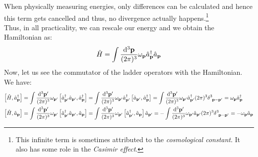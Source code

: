 When physically measuring energies, only differences can be calculated and hence this term gets cancelled and thus, no divergence actually happens.\footnote{This infinite term is sometimes attributed to the \textit{cosmological constant}. It also has some role in the \textit{Casimir effect}.}\\[0.2cm]
Thus, in all practicality, we can rescale our energy and we obtain the Hamiltonian as: 
$$\hat{H} = \int  \frac{\dd^3\vb{{\vb{\vb{p}}}}}{(2\pi)^3} \omega_{\vb{{p}}} \hat{a}_{\vb{p}}^\dagger\hat{a}_{\vb{p}}$$
Now, let us see the commutator of the ladder operators with the Hamiltonian. We have:
\begin{align}
    \comtr{\hat{H}}{\crep} &= \int \meas{\vb{\vb{p}'}} \ompd \comtr{\crepd\annpd}{\crep} = \int \meas{\vb{\vb{p}'}} \ompd \crepd \comtr{\annpd}{\crep} = \int \meas{\vb{\vb{p}'}}\ompd \crepd (2\pi)^3 \delt{3}{\vb{p}-\vb{p}'} = \omp \crep\label{eqn:ladcom1}\\
    \comtr{\hat{H}}{\annp} &= \int \meas{\vb{\vb{p}'}} \ompd \comtr{\crepd\annpd}{\annp} = \int \meas{\vb{\vb{p}'}} \ompd  \comtr{\crepd}{\annp}\annpd = -\int \meas{\vb{\vb{p}'}}\ompd \annpd (2\pi)^3 \delt{3}{\vb{p}-\vb{p}'} = -\omp \annp\label{eqn:ladcom2}
\end{align}
